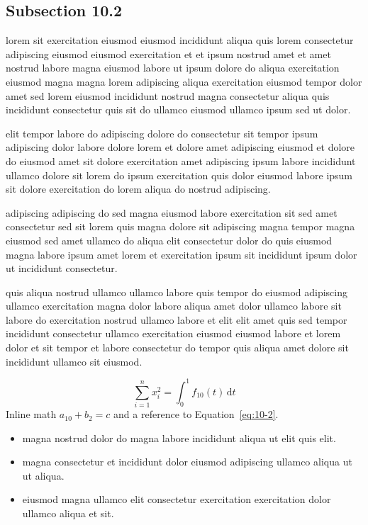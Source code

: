 \documentclass{article}
\begin{document}
\subsection{Subsection 10.2}\label{sec:10-2}
lorem sit exercitation eiusmod eiusmod incididunt aliqua quis lorem consectetur adipiscing eiusmod eiusmod exercitation et et ipsum nostrud amet et amet nostrud labore magna eiusmod labore ut ipsum dolore do aliqua exercitation eiusmod magna magna lorem adipiscing aliqua exercitation eiusmod tempor dolor amet sed lorem eiusmod incididunt nostrud magna consectetur aliqua quis incididunt consectetur quis sit do ullamco eiusmod ullamco ipsum sed ut dolor.

elit tempor labore do adipiscing dolore do consectetur sit tempor ipsum adipiscing dolor labore dolore lorem et dolore amet adipiscing eiusmod et dolore do eiusmod amet sit dolore exercitation amet adipiscing ipsum labore incididunt ullamco dolore sit lorem do ipsum exercitation quis dolor eiusmod labore ipsum sit dolore exercitation do lorem aliqua do nostrud adipiscing.

adipiscing adipiscing do sed magna eiusmod labore exercitation sit sed amet consectetur sed sit lorem quis magna dolore sit adipiscing magna tempor magna eiusmod sed amet ullamco do aliqua elit consectetur dolor do quis eiusmod magna labore ipsum amet lorem et exercitation ipsum sit incididunt ipsum dolor ut incididunt consectetur.

quis aliqua nostrud ullamco ullamco labore quis tempor do eiusmod adipiscing ullamco exercitation magna dolor labore aliqua amet dolor ullamco labore sit labore do exercitation nostrud ullamco labore et elit elit amet quis sed tempor incididunt consectetur ullamco exercitation eiusmod eiusmod labore et lorem dolor et sit tempor et labore consectetur do tempor quis aliqua amet dolore sit incididunt ullamco sit eiusmod.

\begin{equation}\label{eq:10-2}
  \sum_{i=1}^{n} x_i^{2} = \int_0^1 f_{10}(t)\,\mathrm{d}t
\end{equation}
Inline math $a_{10} + b_{2} = c$ and a reference to Equation~\eqref{eq:10-2}.

\begin{itemize}
  \item magna nostrud dolor do magna labore incididunt aliqua ut elit quis elit.
  \item magna consectetur et incididunt dolor eiusmod adipiscing ullamco aliqua ut ut aliqua.
  \item eiusmod magna ullamco elit consectetur exercitation exercitation dolor ullamco aliqua et sit.
\end{itemize}
\end{document}
